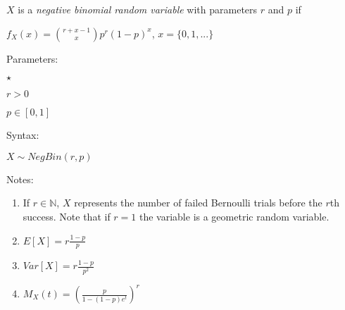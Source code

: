 \documentclass{article}
\begin{document}
$X$ is a \emph{negative binomial random variable} with parameters $r$ and $p$ if\\
\par
$f_X(x) ={r+x-1 \choose x} p^r (1-p)^x$,     $x=\{0,1,...\}$	\\
\par
Parameters:\\
\par
\begin{list}{$\star$ }{}
\item $r > 0$
\item $p \in [0,1]$
\end{list}
\par
Syntax:\\
\par
$X\sim NegBin(r,p)$\\
\par
Notes:\\
\par
\begin{enumerate}

\item If $r \in \mathbb{N}$, $X$ represents the number of failed Bernoulli trials before the $r$th success. Note that if $r=1$ the variable is a geometric random variable.
\item $E[X] = r \frac{1-p}{p}$
\item $Var[X] = r \frac{1-p}{p^2}$
\item $M_X(t) = (\frac{p}{1 - (1-p)e^t})^r$

\end{enumerate}
\end{document}

